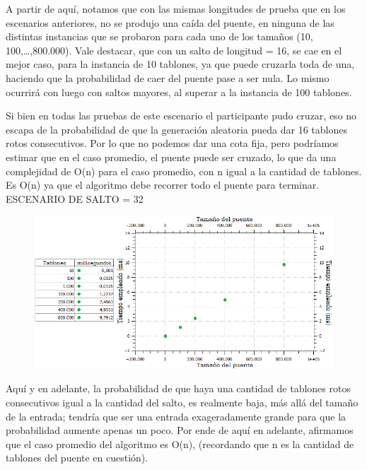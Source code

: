 \documentclass[10pt,a4paper]{article}
\begin{document}
A partir de aquí, notamos que con las mismas longitudes de prueba que en los escenarios anteriores, no se produjo una caída del puente, en ninguna de las distintas instancias que se probaron para cada uno de los tamaños (10, 100,…,800.000). Vale destacar, que con un salto de longitud = 16, se cae en el mejor caso, para la instancia de 10 tablones, ya que puede cruzarla toda de una, haciendo que la probabilidad de caer del puente pase a ser nula. Lo mismo ocurrirá con luego con saltos mayores, al superar a la instancia de 100 tablones.

Si bien en todas las pruebas de este escenario el participante pudo cruzar, eso no escapa de la probabilidad de que la generación aleatoria pueda dar 16 tablones rotos consecutivos. Por lo que no podemos dar una cota fija, pero podríamos estimar que en el caso promedio, el puente puede ser cruzado, lo que da una complejidad de O(n) para el caso promedio, con n igual a la cantidad de tablones.
Es O(n) ya que el algoritmo debe recorrer todo el puente para terminar.\\

\newpage \indent ESCENARIO DE SALTO = 32
	\begin{figure}[h]
		\begin{center}
		   \includegraphics[scale=0.75]{casosDeTest/GRAFICOS/png/randoms/ej1_random_salto32.png}
		\end{center}
	\end{figure}

Aquí y en adelante, la probabilidad de que haya una cantidad de tablones rotos consecutivos igual a la cantidad del salto, es realmente baja, más allá del tamaño de la entrada; tendría que ser una entrada exageradamente grande para que la probabilidad aumente apenas un poco. Por ende de aquí en adelante, afirmamos que el caso promedio del algoritmo es O(n), (recordando que n es la cantidad de tablones del puente en cuestión).
\end{document}
